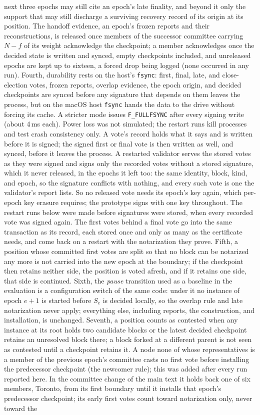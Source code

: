 \documentclass[conference]{IEEEtran}
\begin{document}
next three epochs may still cite an epoch's late finality, and beyond it only the support that may still discharge a surviving recovery record of its origin at its position. The handoff evidence, an epoch's frozen reports and their reconstructions, is released once members of the successor committee carrying $N-f$ of its weight acknowledge the checkpoint; a member acknowledges once the decided state is written and synced, empty checkpoints included, and unreleased epochs are kept up to sixteen, a forced drop being logged (none occurred in any run). Fourth, durability rests on the host's \texttt{fsync}: first, final, late, and close-election votes, frozen reports, overlap evidence, the epoch origin, and decided checkpoints are synced before any signature that depends on them leaves the process, but on the macOS host \texttt{fsync} hands the data to the drive without forcing its cache. A stricter mode issues \texttt{F\_FULLFSYNC} after every signing write (about 4\,ms each). Power loss was not simulated; the restart runs kill processes and test crash consistency only. A vote's record holds what it says and is written before it is signed; the signed first or final vote is then written as well, and synced, before it leaves the process. A restarted validator serves the stored votes as they were signed and signs only the recorded votes without a stored signature, which it never released, in the epochs it left too: the same identity, block, kind, and epoch, so the signature conflicts with nothing, and every such vote is one the validator's report lists. So no released vote needs its epoch's key again, which per-epoch key erasure requires; the prototype signs with one key throughout. The restart runs below were made before signatures were stored, when every recorded vote was signed again. The first votes behind a final vote go into the same transaction as its record, each stored once and only as many as the certificate needs, and come back on a restart with the notarization they prove. Fifth, a position whose committed first votes are split so that no block can be notarized any more is not carried into the new epoch at the boundary; if the checkpoint then retains neither side, the position is voted afresh, and if it retains one side, that side is continued. Sixth, the \emph{pause} transition used as a baseline in the evaluation is a configuration switch of the same code: under it no instance of epoch $e+1$ is started before $S_e$ is decided locally, so the overlap rule and late notarization never apply; everything else, including reports, the construction, and installation, is unchanged. Seventh, a position counts as contested when any instance at its root holds two candidate blocks or the latest decided checkpoint retains an unresolved block there; a block forked at a different parent is not seen as contested until a checkpoint retains it. A node none of whose representatives is a member of the previous epoch's committee casts no first vote before installing the predecessor checkpoint (the newcomer rule); this was added after every run reported here. In the committee change of the main text it holds back one of six members, Toronto, from its first boundary until it installs that epoch's predecessor checkpoint; its early first votes count toward notarization only, never toward the 
\end{document}
